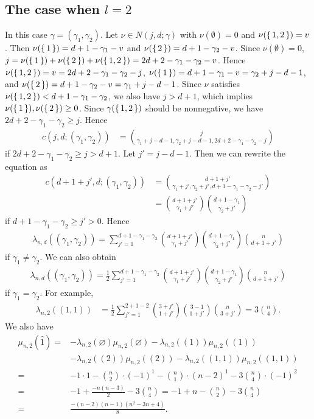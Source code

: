\documentclass{wstmp}
\begin{document}
\subsection{The case when $l=2$}
In this case $\gamma=(\gamma_1,\gamma_2)$.
Let $\nu \in N(j,d;\gamma)$ with $\nu(\emptyset)=0$ and $\nu(\set{1,2})=v$.
Then $\nu(\set{1})=d+1-\gamma_1-v$ and $\nu(\set{2})=d+1-\gamma_2-v$.
Since $\nu(\emptyset)=0$,
$j=\nu(\set{1})+\nu(\set{2})+\nu(\set{1,2})=2d+2-\gamma_1-\gamma_2-v$.
Hence $\nu(\set{1,2})=v=2d+2-\gamma_1-\gamma_2-j$,
$\nu(\set{1})=d+1-\gamma_1-v=\gamma_2+j-d-1$, and
$\nu(\set{2})=d+1-\gamma_2-v=\gamma_1+j-d-1$.
Since $\nu$ satisfies $\nu(\set{1,2})<d+1-\gamma_1-\gamma_2$,
we also have $j>d+1$, which implies $\nu(\set{1}),\nu(\set{2})\geq 0$.
Since $\gamma(\set{1,2})$ should be nonnegative,
we have $2d+2-\gamma_1-\gamma_2\geq j$.
Hence 
\begin{align*}
c(j,d;(\gamma_1,\gamma_2))&=
\binom{j}{\gamma_1+j-d-1,\gamma_2+j-d-1,2d+2-\gamma_1-\gamma_2-j}
\end{align*}
if $ 2d+2-\gamma_1-\gamma_2\geq j>d+1$.
Let $j'=j-d-1$. Then we can rewrite the equation as
\begin{align*}
c(d+1+j',d;(\gamma_1,\gamma_2))
&=
\binom{d+1+j'}{\gamma_1+j',\gamma_2+j',d+1-\gamma_1-\gamma_2-j'}\\
&=
\binom{d+1+j'}{\gamma_1+j'}\binom{d+1-\gamma_1}{\gamma_2+j'}
\end{align*}
if $ d+1-\gamma_1-\gamma_2\geq j'>0$.
Hence 
\begin{align*}
\lambda_{n,d}((\gamma_1, \gamma_2)) =
\sum_{j'=1}^{d+1-\gamma_1-\gamma_2}
\binom{d+1+j'}{\gamma_1+j'}\binom{d+1-\gamma_1}{\gamma_2+j'}
\binom{n}{d+1+j'}
\end{align*}
if $\gamma_1\neq \gamma_2$.
We can also obtain
\begin{align*}
\lambda_{n,d}((\gamma_1, \gamma_2)) =
\frac{1}{2}\sum_{j'=1}^{d+1-\gamma_1-\gamma_2}
\binom{d+1+j'}{\gamma_1+j'}\binom{d+1-\gamma_1}{\gamma_2+j'}
\binom{n}{d+1+j'}
\end{align*}
if $\gamma_1= \gamma_2$.
For example, 
\begin{align*}
\lambda_{n,2}((1,1)) 
&=
\frac{1}{2}\sum_{j'=1}^{2+1-2} \binom{3+j'}{1+j'}\binom{3-1}{1+j'}\binom{n}{3+j'}
=3\binom{n}{4}.
\end{align*}
We also have
\begin{align*}
\mu_{n,2}({\hat{1}})
=&-\lambda_{n,2}({\varnothing})\mu_{n,2}({\varnothing})
-\lambda_{n,2}((1))\mu_{n,2}((1))
\\&
-\lambda_{n,2}((2))\mu_{n,2}((2))
-\lambda_{n,2}((1,1))\mu_{n,2}((1,1))
\\
=&-1\cdot 1
-\binom{n}{2}\cdot(-1)^1
-\binom{n}{1}\cdot (n-2)^1
-3\binom{n}{4}\cdot (-1)^2  
\\
=&-1+\frac{-n(n-3)}{2}-3\binom{n}{4}
=
-1+n-\binom{n}{2}-3\binom{n}{4}\\
=&\frac{-(n- 2)(n- 1)(n^2 - 3n + 4)}{8}.
\end{align*}
\end{document}
